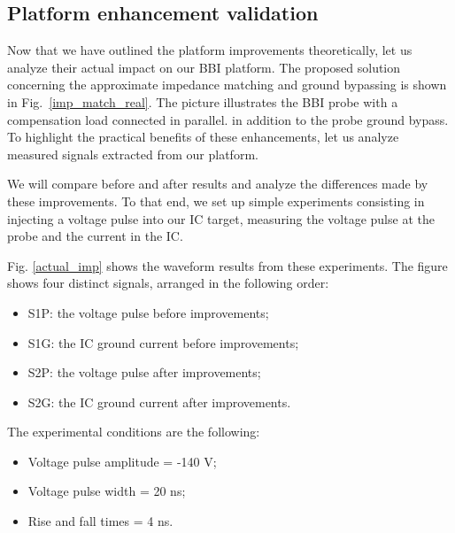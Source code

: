 	\subsection{Platform enhancement validation}
		
		Now that we have outlined the platform improvements theoretically, let us analyze their actual impact on our BBI platform.
		The proposed solution concerning the approximate impedance matching and ground bypassing is shown in \mbox{Fig. \ref{imp_match_real}}.
		The picture illustrates the BBI probe with a compensation load connected in parallel. in addition to the probe ground bypass.
		To highlight the practical benefits of these enhancements, let us analyze measured signals extracted from our platform.

		We will compare before and after results and analyze the differences made by these improvements.
		To that end, we set up simple experiments consisting in injecting a voltage pulse into our IC target, measuring the voltage pulse at the probe and the current in the IC.
		
		Fig. \ref{actual_imp} shows the waveform results from these experiments.
		The figure shows four distinct signals, arranged in the following order:
		\begin{itemize}
			\item S1P: the voltage pulse before improvements;
			\item S1G: the IC ground current before improvements;
			\item S2P: the voltage pulse after improvements;
			\item S2G: the IC ground current after improvements.
		\end{itemize}
		The experimental conditions are the following:
		\begin{itemize}
			\item Voltage pulse amplitude = -140 V;
			\item Voltage pulse width = 20 ns;
			\item Rise and fall times = 4 ns.
		\end{itemize}

